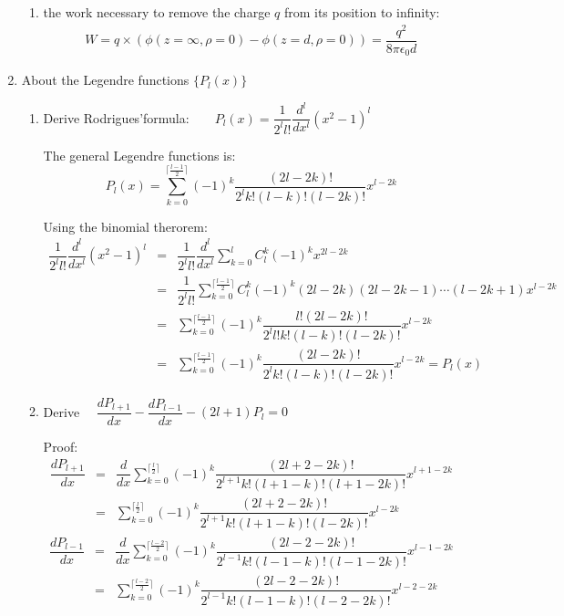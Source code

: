 \documentclass[a4paper,11pt]{article}
\begin{document}
\begin{enumerate}
\begin{enumerate}
    \item the work necessary to remove the charge $q$ from its position to infinity:
    \begin{eqnarray}
      W = q\times(\phi(z=\infty,\rho=0)-\phi(z=d,\rho=0))=\dfrac{q^2}{8\pi\epsilon_0d}
    \end{eqnarray}
  \end{enumerate}

  \item About the Legendre functions $\{P_l(x)\}$
  \begin{enumerate}
    \item Derive Rodrigues'formula:$\quad\quad P_l(x)=\dfrac{1}{2^l l!}\dfrac{d^l}{dx^l}{(x^2-1)}^l$
    
    The general Legendre functions is:
    \begin{equation}
      P_l(x)=\sum\limits^{\lceil\frac{l-1}{2}\rceil}_{k=0}{(-1)}^k\dfrac{(2l-2k)!}{2^l k!(l-k)!(l-2k)!}x^{l-2k}
    \end{equation} 

    Using the binomial therorem:
    \begin{eqnarray}
      \dfrac{1}{2^l l!}\dfrac{d^l}{dx^l}{(x^2-1)}^l
      &=&\dfrac{1}{2^l l!}\dfrac{d^l}{dx^l}\sum\limits_{k=0}^{l}C^{k}_{l}{(-1)}^{k}x^{2l-2k}\nonumber \\
      &=&\dfrac{1}{2^l l!}\sum\limits_{k=0}^{\lceil\frac{l-1}{2}\rceil}C^{k}_{l}{(-1)}^{k}(2l-2k)(2l-2k-1)\dotsm(l-2k+1)x^{l-2k}\nonumber \\
      &=&\sum\limits_{k=0}^{\lceil\frac{l-1}{2}\rceil}{(-1)}^{k}\dfrac{l!(2l-2k)!}{2^l l!k!(l-k)!(l-2k)!}x^{l-2k}\nonumber \\
      &=&\sum\limits^{\lceil\frac{l-1}{2}\rceil}_{k=0}{(-1)}^k\dfrac{(2l-2k)!}{2^l k!(l-k)!(l-2k)!}x^{l-2k}=P_l(x)
    \end{eqnarray}

    \item Derive $\quad \dfrac{dP_{l+1}}{dx}-\dfrac{dP_{l-1}}{dx}-(2l+1)P_l=0$
    
    Proof:
    \begin{eqnarray}
      \dfrac{dP_{l+1}}{dx}
      &=&\dfrac{d}{dx}\sum\limits^{\lceil\frac{l}{2}\rceil}_{k=0}{(-1)}^k\dfrac{(2l+2-2k)!}{2^{l+1} k!(l+1-k)!(l+1-2k)!}x^{l+1-2k}\nonumber \\
      &=&\sum\limits^{\lceil\frac{l}{2}\rceil}_{k=0}{(-1)}^k\dfrac{(2l+2-2k)!}{2^{l+1} k!(l+1-k)!(l-2k)!}x^{l-2k}
    \end{eqnarray}
    \begin{eqnarray}
      \dfrac{dP_{l-1}}{dx}
      &=&\dfrac{d}{dx}\sum\limits^{\lceil\frac{l-2}{2}\rceil}_{k=0}{(-1)}^k\dfrac{(2l-2-2k)!}{2^{l-1} k!(l-1-k)!(l-1-2k)!}x^{l-1-2k}\nonumber \\
      &=&\sum\limits^{\lceil\frac{l-2}{2}\rceil}_{k=0}{(-1)}^k\dfrac{(2l-2-2k)!}{2^{l-1} k!(l-1-k)!(l-2-2k)!}x^{l-2-2k}
    \end{eqnarray}
      

\end{enumerate}
\end{enumerate}
\end{document}

